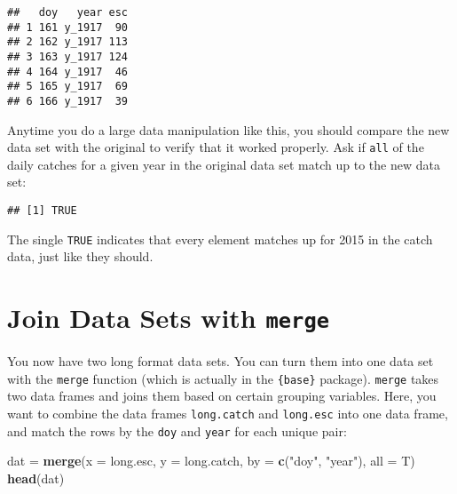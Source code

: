 \documentclass[]{book}
\newenvironment{Shaded}{\begin{snugshade}}{\end{snugshade}}
\newcommand{\KeywordTok}[1]{\textcolor[rgb]{0.13,0.29,0.53}{\textbf{#1}}}
\newcommand{\DataTypeTok}[1]{\textcolor[rgb]{0.13,0.29,0.53}{#1}}
\newcommand{\DecValTok}[1]{\textcolor[rgb]{0.00,0.00,0.81}{#1}}
\newcommand{\StringTok}[1]{\textcolor[rgb]{0.31,0.60,0.02}{#1}}
\newcommand{\OperatorTok}[1]{\textcolor[rgb]{0.81,0.36,0.00}{\textbf{#1}}}
\newcommand{\NormalTok}[1]{#1}
\theoremstyle{definition}
\theoremstyle{definition}
\theoremstyle{definition}
\theoremstyle{remark}
\begin{document}
\begin{verbatim}
##   doy   year esc
## 1 161 y_1917  90
## 2 162 y_1917 113
## 3 163 y_1917 124
## 4 164 y_1917  46
## 5 165 y_1917  69
## 6 166 y_1917  39
\end{verbatim}

Anytime you do a large data manipulation like this, you should compare
the new data set with the original to verify that it worked properly.
Ask if \texttt{all} of the daily catches for a given year in the
original data set match up to the new data set:

\begin{Shaded}
\end{Shaded}

\begin{verbatim}
## [1] TRUE
\end{verbatim}

The single \texttt{TRUE} indicates that every element matches up for
2015 in the catch data, just like they should.

\section{\texorpdfstring{Join Data Sets with
\texttt{merge}}{Join Data Sets with merge}}\label{join-data-sets-with-merge}

You now have two long format data sets. You can turn them into one data
set with the \texttt{merge} function (which is actually in the
\texttt{\{base\}} package). \texttt{merge} takes two data frames and
joins them based on certain grouping variables. Here, you want to
combine the data frames \texttt{long.catch} and \texttt{long.esc} into
one data frame, and match the rows by the \texttt{doy} and \texttt{year}
for each unique pair:

\begin{Shaded}
\begin{Highlighting}[]
\NormalTok{dat =}\StringTok{ }\KeywordTok{merge}\NormalTok{(}\DataTypeTok{x =}\NormalTok{ long.esc, }\DataTypeTok{y =}\NormalTok{ long.catch,}
            \DataTypeTok{by =} \KeywordTok{c}\NormalTok{(}\StringTok{"doy"}\NormalTok{, }\StringTok{"year"}\NormalTok{), }\DataTypeTok{all =}\NormalTok{ T)}
\KeywordTok{head}\NormalTok{(dat)}
\end{Highlighting}
\end{Shaded}
\end{document}
